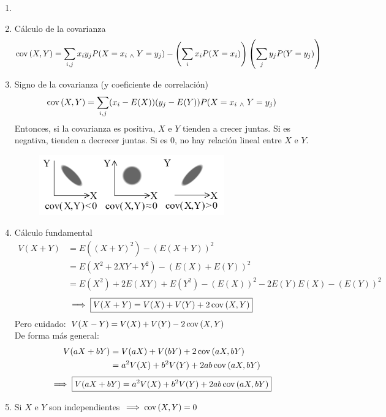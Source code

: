 
\begin{obs}
	\begin{enumerate}
		\item[]
		\item Cálculo de la covarianza
		      \[\operatorname{cov}\left(X, Y\right) = \sum_{i,j}x_iy_jP(X=x_i \; _{\wedge} \; Y=y_j) - \left(\sum_{i} x_iP(X=x_i)\right)\left(\sum_{j} y_jP(Y=y_j)\right)\]
		\item Signo de la covarianza (y coeficiente de correlación)
		      \[\operatorname{cov}\left(X, Y\right) = \sum_{i,j}(x_i-E(X))(y_j-E(Y))P(X=x_i \; _{\wedge} \; Y=y_j)\]
		      Entonces, si la covarianza es positiva, $X$ e $Y$ tienden a crecer juntas. Si es negativa, tienden a decrecer juntas. Si es 0, no hay relación lineal entre $X$ e $Y$.
		      \begin{figure}[htbp]
				\centering
				\vspace{-0.3cm}
			      \includegraphics[width=8cm]{img/covarianza.png}
				  \vspace{-0.6cm}
		      \end{figure}
		\item Cálculo fundamental
		      \begin{align*}
			      V(X+ Y) & = E((X+Y)^2)- (E(X+Y))^2                              \\
			              & = E(X^2+2XY+Y^2)- (E(X)+E(Y))^2                       \\
			              & = E(X^2)+2E(XY)+E(Y^2)- (E(X))^2-2E(Y)E(X) - (E(Y))^2
		      \end{align*}
		      \[\implies \boxed{V(X+ Y) = V(X) + V(Y) + 2\operatorname{cov}\left(X, Y\right)}\]
		      Pero cuidado: $V(X-Y)=V(X) + V(Y) -2\operatorname{cov}\left(X, Y\right)$ \\
		      De forma más general:
		      \begin{align*}
			      V(aX+ bY) & = V(aX) + V(bY) + 2\operatorname{cov}\left(aX, bY\right)       \\
			                & = a^2V(X) + b^2V(Y) + 2ab\operatorname{cov}\left(aX, bY\right)
		      \end{align*}
		      \[\implies \boxed{V(aX+ bY)=a^2V(X) + b^2V(Y) + 2ab\operatorname{cov}\left(aX, bY\right)}\]
		\item Si $X$ e $Y$ son independientes $\implies \operatorname{cov}\left(X, Y\right)=0$
	\end{enumerate}
\end{obs}


